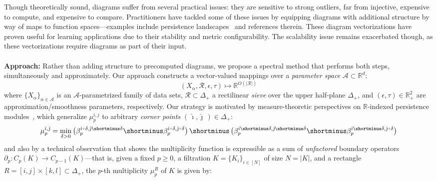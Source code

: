 \documentclass[10pt twocolumn]{article}
\numberwithin{equation}{section}
\newcommand{\+}{%
	\raisebox{0.18ex}{\scaleobj{0.55}{+}}
}
\theoremstyle{definition}
\theoremstyle{definition}
\begin{document}
\begin{multicols}{2}
Though theoretically sound, diagrams suffer from several practical issues: they are sensitive to strong outliers, far from injective, expensive to compute, and expensive to compare. 
Practitioners have tackled some of these issues by equipping diagrams with additional structure by way of maps to function spaces---examples include persistence landscapes~\cite{bubenik2015statistical} and references therein. 
These diagram vectorizations have proven useful for learning applications due to their stability and  metric configurability.
The scalability issue remains exacerbated though, as these vectorizations require diagrams as part of their input. %
\\
\\
\noindent \textbf{Approach:}
Rather than adding structure to precomputed diagrams, we propose a spectral method that performs both steps, simultaneously and approximately. 
Our approach constructs a vector-valued mappings over a \emph{parameter space} $\mathcal{A} \subset \mathbb{R}^d$: 
\begin{equation*}\label{eq:relaxation_mapping}
	(X_\alpha, \mathcal{R}, \epsilon, \tau) \mapsto \mathbb{R}^{O(\lvert \mathcal{R} \rvert)}
\end{equation*}
where $\{X_\alpha\}_{\alpha \in \mathcal{A}}$ is an  $\mathcal{A}$-parametrized family of data sets, $\mathcal{R} \subset \Delta_+$ a rectilinear \emph{sieve} over the upper half-plane $\Delta_+$, and $(\epsilon, \tau) \in \mathbb{R}_+^2$ are approximation/smoothness parameters, respectively.
Our strategy is motivated by measure-theoretic perspectives on $\mathbb{R}$-indexed persistence modules~\cite{cerri2013betti, chazal2016structure}, which generalize $\mu_p^{i,j}$ to arbitrary \emph{corner points} $(\, \hat\imath, \hat\jmath \,) \in \Delta_+$:
\begin{multline*}\label{eq:measure}
\mu_p^{\hat\imath, \hat\jmath} = \min_{\delta > 0} \left(\beta_p^{\hat\imath \+ \delta, \hat\jmath \shortminus \delta} \shortminus \beta_p^{\hat\imath \+ \delta, \hat\jmath  \+ \delta} \right) \shortminus \left(\beta_p^{\hat\imath \shortminus \delta, \hat\jmath \shortminus \delta} \shortminus \beta_p^{\hat\imath \shortminus \delta, \hat\jmath  \+ \delta} \right)
\end{multline*}
and also by a technical observation that shows the multiplicity function is expressible as a sum of \emph{unfactored} boundary operators $\partial_p : C_p(K) \to C_{p-1}(K)$---that is, given a fixed $p \geq 0$, a filtration $K = \{K_i\}_{i\in [N]}$ of size $N = \lvert K \rvert$, and a rectangle $R = [i,j] \times [k,l] \subset \Delta_+$, the $p$-th multiplicity $\mu_p^{R}$ of $K$ is given by:

\end{multicols}
\end{document}
